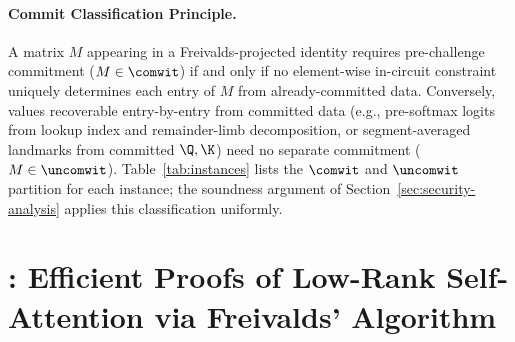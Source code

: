 \documentclass[runningheads]{llncs}
\begin{document}
\paragraph{Commit Classification Principle.}
A matrix $M$ appearing in a Freivalds-projected identity requires pre-challenge commitment ($M \in \comwit$) if and only if no element-wise in-circuit constraint uniquely determines each entry of $M$ from already-committed data. Conversely, values recoverable entry-by-entry from committed data (e.g., pre-softmax logits from lookup index and remainder-limb decomposition, or segment-averaged landmarks from committed $\Q, \K$) need no separate commitment ($M \in \uncomwit$). Table~\ref{tab:instances} lists the $\comwit$ and $\uncomwit$ partition for each instance; the soundness argument of Section~\ref{sec:security-analysis} applies this classification uniformly.

\section{\name: Efficient Proofs of Low-Rank Self-Attention via Freivalds' Algorithm}
\label{sec:protocol}

\subsection{}\label{subsec:nystrom-attention}
\end{document}
